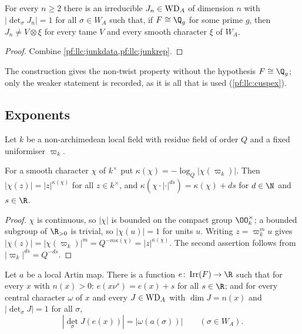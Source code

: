 \begin{proposition}\label{pf:llc:junkex}
For every $n\ge2$ there is an irreducible $J_n\in\mathrm{WD}_A$ of dimension $n$ with $|\det_\sigma J_n|=1$ for all $\sigma\in W_A$
such that, if $F\cong\Q_g$ for some prime $g$, then $J_n\ne V\otimes\xi$ for every tame $V$ and every smooth character
$\xi$ of $W_A$. 
\end{proposition}

\begin{proof}
Combine \cref{pf:llc:junkdata,pf:llc:junkrep}.
\end{proof}

The construction gives the non-twist property without the hypothesis $F\cong\Q_g$; only the weaker statement is
recorded, as it is all that is used (\cref{pf:llc:cuspex}).

\subsection{Exponents}\label{pf:llc:sec-expo}

Let $k$ be a non-archimedean local field with residue field of order $Q$ and a fixed uniformiser $\varpi_k$.

\begin{lemma}\label{pf:llc:normchar}
For a smooth character $\chi$ of $k^\times$ put $\kappa(\chi)=-\log_Q|\chi(\varpi_k)|$. Then $|\chi(z)|=|z|^{\kappa(\chi)}$ for
all $z\in k^\times$, and $\kappa(\chi\cdot|\cdot|^{ds})=\kappa(\chi)+ds$ for $d\in\N$ and $s\in\R$.
\end{lemma}

\begin{proof}
$\chi$ is continuous, so $|\chi|$ is bounded on the compact group $\OO_k^\times$; a bounded subgroup of $\R_{>0}$ is
trivial, so $|\chi(u)|=1$ for units $u$. Writing $z=\varpi_k^mu$ gives $|\chi(z)|=|\chi(\varpi_k)|^m=Q^{-m\kappa(\chi)}=
|z|^{\kappa(\chi)}$. The second assertion follows from $|\varpi_k|^{ds}=Q^{-ds}$.
\end{proof}

\begin{proposition}[Exponents]\label{pf:llc:expo}
Let $a$ be a local Artin map. There is a function $e\colon\llcIrr(F)\to\R$ such that for every $x$ with $n(x)>0$:
$e(x\nu^s)=e(x)+s$ for all $s\in\R$; and for every central character $\omega$ of $x$ and every $J\in\mathrm{WD}_A$ with
$\dim J=n(x)$ and $|\det_\sigma J|=1$ for all $\sigma$,
\[
  |\det_\sigma J(e(x))|=|\omega(a(\sigma))|\qquad(\sigma\in W_A).
\]
\end{proposition}

